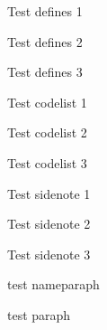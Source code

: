 \documentclass{claynote}
\begin{document}
    \begin{pre}
        
    \end{pre}

    \begin{body}
        \begin{defines}
            Test defines 1
        \end{defines}
        \begin{defines}
            Test defines 2
        \end{defines}
        \begin{defines}
            Test defines 3
        \end{defines}

        \begin{codelist}
            Test codelist 1
        \end{codelist}
        \begin{codelist}
            Test codelist 2
        \end{codelist}
        \begin{codelist}
            Test codelist 3
        \end{codelist}

        \begin{sidenote}
            Test sidenote 1
        \end{sidenote}
        \begin{sidenote}
            Test sidenote 2
        \end{sidenote}
        \begin{sidenote}
            Test sidenote 3
        \end{sidenote}

        {
            test nameparaph
        }

        {
            test paraph
        }
    \end{body}

    \begin{append}

    \end{append}
\end{document}
